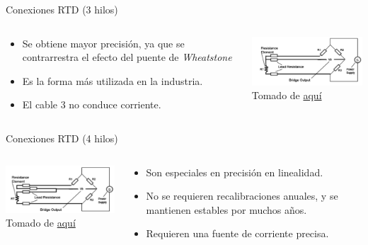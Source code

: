 \documentclass[aspectratio=169]{beamer}
\begin{document}
\begin{frame}{Conexiones RTD (3 hilos)}
    \begin{columns}[c, onlytextwidth]
    \begin{column}{0.55\textwidth}
            \begin{itemize}
                \item Se obtiene mayor precisión, ya que se contrarrestra el efecto del puente de \textit{Wheatstone}     
                \item Es la forma más utilizada en la industria.
                \item El cable 3 no conduce corriente.
            \end{itemize}
        \end{column}
        \begin{column}{0.45\textwidth}
        \includegraphics[width=7cm]{fig/3hilosRTD.PNG}
            \\ \tiny{Tomado de \href{http://www.bearingsensor.com/bearing-rtd.html}{aquí}}
            
        \end{column}
        
    \end{columns}
\end{frame}
\begin{frame}{Conexiones RTD (4 hilos)}
    \begin{columns}[c, onlytextwidth]
        \begin{column}{0.45\textwidth}
        \includegraphics[width=6.5cm]{fig/4hilosRTD.PNG}
            \\ \tiny{Tomado de \href{http://www.bearingsensor.com/bearing-rtd.html}{aquí}}
            
        \end{column}
    \begin{column}{0.55\textwidth}
            \begin{itemize}
                \item Son especiales en precisión en linealidad.      
                \item No se requieren recalibraciones anuales, y se mantienen estables por muchos años. 
                \item Requieren una fuente de corriente precisa. 
            \end{itemize}
        \end{column}
        
    \end{columns}
\end{frame}
\end{document}
